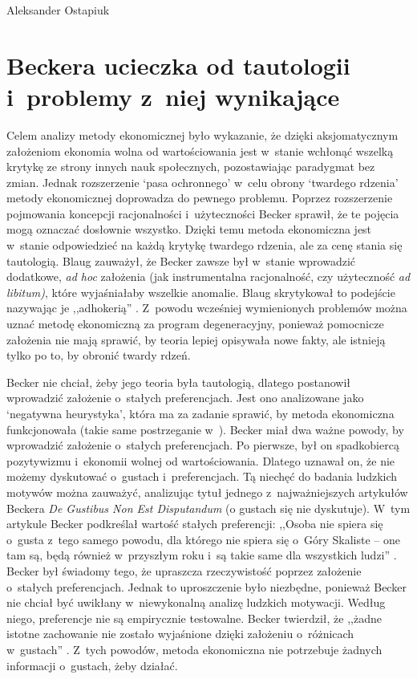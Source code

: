 \begin{artplenv}{Aleksander Ostapiuk}
\section{Beckera ucieczka od tautologii i~problemy z~niej wynikające}
Celem analizy metody ekonomicznej było wykazanie, że dzięki aksjomatycznym założeniom ekonomia wolna od wartościowania
jest w~stanie wchłonąć wszelką krytykę ze strony innych nauk społecznych, pozostawiając paradygmat bez zmian. Jednak
rozszerzenie `pasa ochronnego' w~celu obrony `twardego rdzenia' metody ekonomicznej doprowadza do pewnego problemu.
Poprzez rozszerzenie pojmowania koncepcji racjonalności i~użyteczności Becker sprawił, że te pojęcia mogą oznaczać
dosłownie wszystko. Dzięki temu metoda ekonomiczna jest w~stanie odpowiedzieć na każdą krytykę twardego rdzenia, ale za
cenę stania się tautologią. Blaug zauważył, że Becker zawsze był w~stanie wprowadzić dodatkowe, \textit{ad hoc}
założenia (jak instrumentalna racjonalność, czy użyteczność \textit{ad libitum)}, które wyjaśniałaby wszelkie
anomalie. Blaug skrytykował to podejście nazywając je ,,adhokerią''
\parencite[s.~325–326]{blaug_metodologia_1995}.
Z~powodu wcześniej wymienionych problemów można uznać metodę ekonomiczną za program degeneracyjny, ponieważ pomocnicze
założenia nie mają sprawić, by teoria lepiej opisywała nowe fakty, ale istnieją tylko po to, by obronić twardy rdzeń. 

Becker nie chciał, żeby jego teoria była tautologią, dlatego postanowił wprowadzić założenie o~stałych preferencjach.
Jest ono analizowane jako `negatywna heurystyka', która ma za zadanie sprawić, by metoda ekonomiczna funkcjonowała
(takie same postrzeganie w~\parencite[s.~323–324]{blaug_metodologia_1995}).
Becker miał dwa ważne powody, by
wprowadzić założenie o~stałych preferencjach. Po pierwsze, był on spadkobiercą pozytywizmu i~ekonomii wolnej od
wartościowania. Dlatego uznawał on, że nie możemy dyskutować o~gustach i~preferencjach. Tą niechęć do badania ludzkich
motywów można zauważyć, analizując tytuł jednego z~najważniejszych artykułów Beckera \textit{De Gustibus Non Est
Disputandum} (o gustach się nie dyskutuje). W~tym artykule Becker podkreślał wartość stałych preferencji: ,,Osoba nie
spiera się o~gusta z~tego samego powodu, dla którego nie spiera się o~Góry Skaliste -- one tam są, będą
również w~przyszłym roku i~są takie same dla wszystkich ludzi''
\parencite[s.~76]{becker_gustibus_1977}.
Becker
był świadomy tego, że upraszcza rzeczywistość poprzez założenie o~stałych preferencjach. Jednak to uproszczenie było
niezbędne, ponieważ Becker nie chciał być uwikłany w~niewykonalną analizę ludzkich motywacji. Według niego, preferencje
nie są empirycznie testowalne. Becker twierdził, że ,,żadne istotne zachowanie nie zostało wyjaśnione dzięki
założeniu o~różnicach w~gustach''
\parencite[ s.~89]{becker_gustibus_1977}.
Z~tych powodów, metoda ekonomiczna nie
potrzebuje żadnych informacji o~gustach, żeby działać. 


\end{artplenv}
